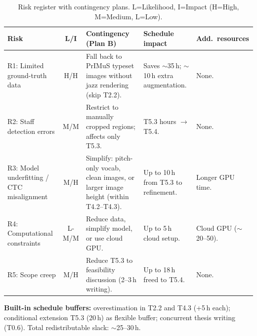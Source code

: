 \documentclass[11pt, a4paper]{article}
\begin{document}
\begin{table}[h!]
    \centering
    \caption{Risk register with contingency plans. L=Likelihood, I=Impact (H=High, M=Medium, L=Low).}
    \label{tab:risks}
    \renewcommand{\arraystretch}{1.15}
    \scriptsize
    \begin{tabularx}{\linewidth}{>{\raggedright}p{2.2cm} c >{\raggedright}p{3.2cm} >{\raggedright}p{2.8cm} >{\raggedright\arraybackslash}p{2.0cm}}
        \toprule
        \textbf{Risk} & \textbf{L/I} & \textbf{Contingency (Plan B)} & \textbf{Schedule impact} & \textbf{Add.\ resources} \\
        \midrule
        R1: Limited ground-truth data &
        H/H &
        Fall back to PrIMuS typeset images without jazz rendering (skip T2.2). &
        Saves $\sim$35\,h; $\sim$10\,h extra augmentation. &
        None. \\
        \addlinespace
        R2: Staff detection errors &
        M/M &
        Restrict to manually cropped regions; affects only T5.3. &
        T5.3 hours $\to$ T5.4. &
        None. \\
        \addlinespace
        R3: Model underfitting / CTC misalignment &
        M/H &
        Simplify: pitch-only vocab, clean images, or larger image height (within T4.2--T4.3). &
        Up to 10\,h from T5.3 to refinement. &
        Longer GPU time. \\
        \addlinespace
        R4: Computational constraints &
        L-M/M &
        Reduce data, simplify model, or use cloud GPU. &
        Up to 5\,h cloud setup. &
        Cloud GPU ($\sim$\EUR{}20--50). \\
        \addlinespace
        R5: Scope creep &
        M/H &
        Reduce T5.3 to feasibility discussion (2--3\,h writing). &
        Up to 18\,h freed to T5.4. &
        None. \\
        \bottomrule
    \end{tabularx}
\end{table}

\textbf{Built-in schedule buffers:} overestimation in T2.2 and T4.3 (+5\,h each); conditional extension T5.3 (20\,h) as flexible buffer; concurrent thesis writing (T0.6). Total redistributable slack: $\sim$25--30\,h.

\newpage
\printbibliography[heading=bibintoc, title={References}]
\end{document}
